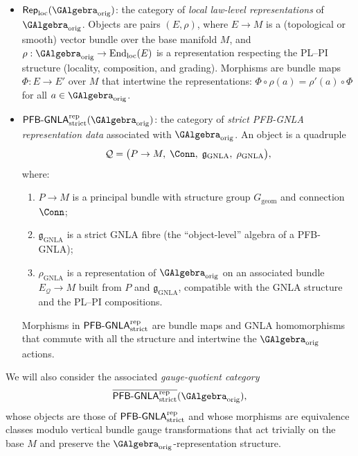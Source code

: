 \documentclass[11pt]{book}
\theoremstyle{plain}
\theoremstyle{definition}
\begin{document}
\begin{itemize}
  \item \(\mathsf{Rep}_{\mathrm{loc}}(\GAlgebra_{\mathrm{orig}})\):
        the category of \emph{local law-level representations} of
        \(\GAlgebra_{\mathrm{orig}}\).  Objects are pairs
        \((E,\rho)\), where \(E\to M\) is a (topological or smooth)
        vector bundle over the base manifold \(M\), and
        \(\rho:\GAlgebra_{\mathrm{orig}}\to
        \mathrm{End}_{\mathrm{loc}}(E)\) is a representation respecting
        the PL--PI structure (locality, composition, and grading).
        Morphisms are bundle maps \(\Phi:E\to E'\) over \(M\) that
        intertwine the representations:
        \(\Phi\circ\rho(a)=\rho'(a)\circ\Phi\) for all
        \(a\in\GAlgebra_{\mathrm{orig}}\).
  \item \(\mathsf{PFB\text- GNLA}^{\mathrm{rep}}_{\mathrm{strict}}(\GAlgebra_{\mathrm{orig}})\):
        the category of \emph{strict PFB-GNLA representation data}
        associated with \(\GAlgebra_{\mathrm{orig}}\).  An object is a
        quadruple
        \[
          \mathcal{Q}
          =
          \bigl(P\to M,\;
                \Conn,\;
                \mathfrak{g}_{\mathrm{GNLA}},\;
                \rho_{\mathrm{GNLA}}\bigr),
        \]
        where:
        \begin{enumerate}
          \item \(P\to M\) is a principal bundle with structure group
                \(G_{\mathrm{geom}}\) and connection \(\Conn\);
          \item \(\mathfrak{g}_{\mathrm{GNLA}}\) is a strict GNLA fibre
                (the ``object-level'' algebra of a PFB-GNLA);
          \item \(\rho_{\mathrm{GNLA}}\) is a representation of
                \(\GAlgebra_{\mathrm{orig}}\) on an associated bundle
                \(E_{\mathcal{Q}}\to M\) built from \(P\) and
                \(\mathfrak{g}_{\mathrm{GNLA}}\), compatible with the
                GNLA structure and the PL--PI compositions.
        \end{enumerate}
        Morphisms in
        \(\mathsf{PFB\text- GNLA}^{\mathrm{rep}}_{\mathrm{strict}}\)
        are bundle maps and GNLA homomorphisms that commute with all
        the structure and intertwine the \(\GAlgebra_{\mathrm{orig}}\)
        actions.
\end{itemize}

We will also consider the associated \emph{gauge-quotient category}
\[
  \overline{\mathsf{PFB\text- GNLA}^{\mathrm{rep}}_{\mathrm{strict}}}
  (\GAlgebra_{\mathrm{orig}}),
\]
whose objects are those of
\(\mathsf{PFB\text- GNLA}^{\mathrm{rep}}_{\mathrm{strict}}\) and whose
morphisms are equivalence classes modulo vertical bundle gauge
transformations that act trivially on the base \(M\) and preserve the
\(\GAlgebra_{\mathrm{orig}}\)-representation structure.
\end{document}
